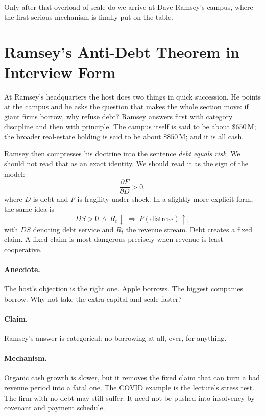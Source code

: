 Only after that overload of scale do we arrive at Dave Ramsey's campus, where the first serious mechanism is finally put on the table.

\section{Ramsey's Anti-Debt Theorem in Interview Form}

At Ramsey's headquarters the host does two things in quick succession. He points at the campus and he asks the question that makes the whole section move: if giant firms borrow, why refuse debt? Ramsey answers first with category discipline and then with principle. The campus itself is said to be about \( \$650\,\mathrm{M}\); the broader real-estate holding is said to be about \( \$850\,\mathrm{M}\); and it is all cash.

Ramsey then compresses his doctrine into the sentence \emph{debt equals risk}. We should not read that as an exact identity. We should read it as the sign of the model:
\begin{equation}
\frac{\partial F}{\partial D}>0,
\end{equation}
where \(D\) is debt and \(F\) is fragility under shock. In a slightly more explicit form, the same idea is
\begin{equation}
DS>0 \ \land\ R_t\downarrow \ \Rightarrow\ P(\text{distress})\uparrow,
\end{equation}
with \(DS\) denoting debt service and \(R_t\) the revenue stream. Debt creates a fixed claim. A fixed claim is most dangerous precisely when revenue is least cooperative.

\paragraph{Anecdote.} The host's objection is the right one. Apple borrows. The biggest companies borrow. Why not take the extra capital and scale faster?

\paragraph{Claim.} Ramsey's answer is categorical: no borrowing at all, ever, for anything.

\paragraph{Mechanism.} Organic cash growth is slower, but it removes the fixed claim that can turn a bad revenue period into a fatal one. The COVID example is the lecture's stress test. The firm with no debt may still suffer. It need not be pushed into insolvency by covenant and payment schedule.

